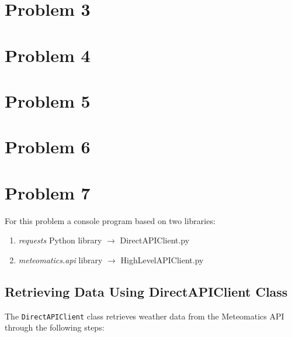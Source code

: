 	\newpage
	\section*{Problem 3}\label{sec:prob-3}


	\newpage
	\section*{Problem 4}\label{sec:prob-4}


	\newpage
	\section*{Problem 5}\label{sec:prob-5}


	\newpage
	\section*{Problem 6}\label{sec:prob-6}


	\newpage
	\section*{Problem 7}\label{sec:prob-7}
	For this problem a console program based on two libraries:
	\begin{enumerate}
	\item 	\textit{requests} Python library $ \rightarrow $ DirectAPIClient.py
	\item 	\textit{meteomatics.api} library $ \rightarrow $ HighLevelAPIClient.py
	\end{enumerate}
	
	\subsection*{Retrieving Data Using DirectAPIClient Class}
	The \texttt{DirectAPIClient} class retrieves weather data from the Meteomatics API through the following steps:
	
